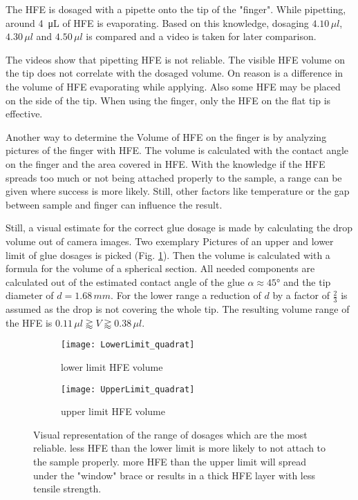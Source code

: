 
The HFE is dosaged with a pipette onto the tip of the "finger". While pipetting, around \SI{4}{\micro\liter} of HFE is evaporating. Based on this knowledge, dosaging $4.10\,\mu l$, $4.30\,\mu l$ and $4.50\,\mu l$ is compared and a video is taken for later comparison.

The videos show that pipetting HFE is not reliable. The visible HFE volume on the tip does not correlate with the dosaged volume. On reason is a difference in the volume of HFE evaporating while applying. Also some HFE may be placed on the side of the tip. When using the finger, only the HFE on the flat tip is effective.

Another way to determine the Volume of HFE on the finger is by analyzing pictures of the finger with HFE. The volume is calculated with the contact angle on the finger and the area covered in HFE. With the knowledge if the HFE spreads too much or not being attached properly to the sample, a range can be given where success is more likely. Still, other factors like temperature or the gap between sample and finger can influence the result.

Still, a visual estimate for the correct glue dosage is made by calculating the drop volume out of camera images. Two exemplary Pictures of an upper and lower limit of glue dosages is picked (Fig. \ref{fig:rangeHFE}). Then the volume is calculated with a formula for the volume of a spherical section. All needed components are calculated out of the estimated contact angle of the glue $\alpha \approx 45°$ and the tip diameter of $d = 1.68\,mm$. For the lower range a reduction of $d$ by a factor of $\frac{2}{3}$ is assumed as the drop is not covering the whole tip. The resulting volume range of the HFE is $ 0.11\,\mu l \gtrapprox V \gtrapprox 0.38\,\mu l $.

\begin{figure}[hbt!]
	\centering
	\begin{subfigure}[]{0.45\textwidth}
		\centering
		\texttt{[image: LowerLimit\_quadrat]}
		\caption{lower limit HFE volume}
	\end{subfigure}
	\begin{subfigure}[]{0.45\textwidth}
		\centering
		\texttt{[image: UpperLimit\_quadrat]}
		\caption{upper limit HFE volume}
	\end{subfigure}
	\caption{Visual representation of the range of dosages which are the most reliable. less HFE than the lower limit is more likely to not attach to the sample properly. more HFE than the upper limit will spread under the "window" brace or results in a thick HFE layer with less tensile strength.}
	\label{fig:rangeHFE}
\end{figure}

